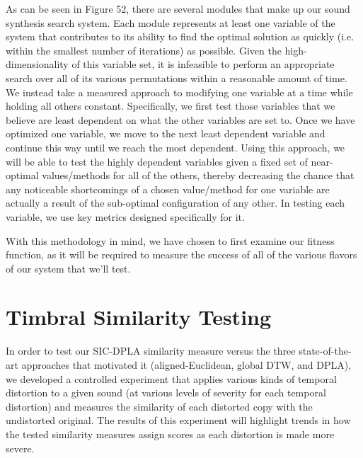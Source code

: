 \documentclass[12pt]{report} 	%
\numberwithin{figure}{chapter}
\numberwithin{table}{chapter}
\numberwithin{equation}{chapter}
\begin{document}
\begin{flushleft}
As can be seen in Figure 52, there are several modules that make up our sound synthesis search system. Each module represents at least one variable of the system that contributes to its ability to find the optimal solution as quickly (i.e. within the smallest number of iterations) as possible. Given the high-dimensionality of this variable set, it is infeasible to perform an appropriate search over all of its various permutations within a reasonable amount of time. We instead take a measured approach to modifying one variable at a time while holding all others constant. Specifically, we first test those variables that we believe are least dependent on what the other variables are set to. Once we have optimized one variable, we move to the next least dependent variable and continue this way until we reach the most dependent. Using this approach, we will be able to test the highly dependent variables given a fixed set of near-optimal values/methods for all of the others, thereby decreasing the chance that any noticeable shortcomings of a chosen value/method for one variable are actually a result of the sub-optimal configuration of any other. In testing each variable, we use key metrics designed specifically for it.

With this methodology in mind, we have chosen to first examine our fitness function, as it will be required to measure the success of all of the various flavors of our system that we'll test.

\section{Timbral Similarity Testing}
In order to test our SIC-DPLA similarity measure versus the three state-of-the-art approaches that motivated it (aligned-Euclidean, global DTW, and DPLA), we developed a controlled experiment that applies various kinds of temporal distortion to a given sound (at various levels of severity for each temporal distortion) and measures the similarity of each distorted copy with the undistorted original. The results of this experiment will highlight trends in how the tested similarity measures assign scores as each distortion is made more severe.


\end{flushleft}
\end{document}
